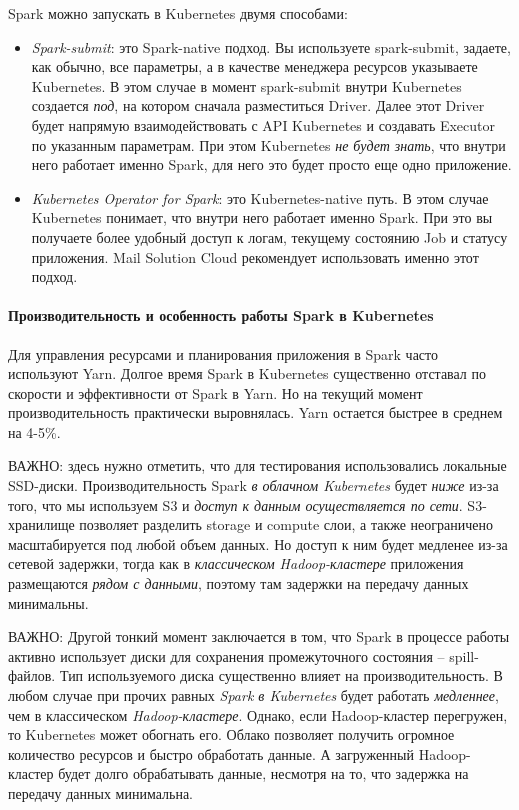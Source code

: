 \documentclass[%
	11pt,
	a4paper,
	utf8,
		]{article}
\begin{document}
Spark можно запускать в Kubernetes двумя способами:
\begin{itemize}
	\item \emph{Spark-submit}: это Spark-native подход. Вы используете spark-submit, задаете, как обычно, все параметры, а в качестве менеджера ресурсов указываете Kubernetes. В этом случае в момент spark-submit внутри Kubernetes создается \emph{под}, на котором сначала разместиться Driver. Далее этот Driver будет напрямую взаимодействовать с API Kubernetes и создавать Executor по указанным параметрам. При этом Kubernetes \emph{не будет знать}, что внутри него работает именно Spark, для него это будет просто еще одно приложение.
	
	\item \emph{Kubernetes Operator for Spark}: это Kubernetes-native путь. В этом случае Kubernetes понимает, что внутри него работает именно Spark. При это вы получаете более удобный доступ к логам, текущему состоянию Job и статусу приложения. Mail Solution Cloud рекомендует использовать именно этот подход.
\end{itemize}

\paragraph{Производительность и особенность работы Spark в Kubernetes} Для управления ресурсами и планирования приложения в Spark часто используют Yarn. Долгое время Spark в Kubernetes существенно отставал по скорости и эффективности от Spark в Yarn. Но на текущий момент производительность практически выровнялась. Yarn остается быстрее в среднем на 4-5\%.

ВАЖНО: здесь нужно отметить, что для тестирования использовались локальные SSD-диски. Производительность Spark \emph{в облачном Kubernetes} будет \emph{\color{red} ниже} из-за того, что мы используем S3 и \emph{\color{red} доступ к данным осуществляется по сети}. S3-хранилище позволяет разделить storage и compute слои, а также неограничено масштабируется под любой объем данных. Но доступ к ним будет медленее из-за сетевой задержки, тогда как в \emph{классическом Hadoop-кластере} приложения размещаются \emph{рядом с данными}, поэтому там задержки на передачу данных минимальны.

ВАЖНО: Другой тонкий момент заключается в том, что Spark в процессе работы активно использует диски для сохранения промежуточного состояния -- spill-файлов. Тип используемого диска существенно влияет на производительность. В любом случае при прочих равных \emph{Spark в Kubernetes} будет работать \emph{медленнее}, чем в классическом \emph{Hadoop-кластере}. Однако, если Hadoop-кластер перегружен, то Kubernetes может обогнать его. Облако позволяет получить огромное количество ресурсов и быстро обработать данные. А загруженный Hadoop-кластер будет долго обрабатывать данные, несмотря на то, что задержка на передачу данных минимальна.
\end{document}
